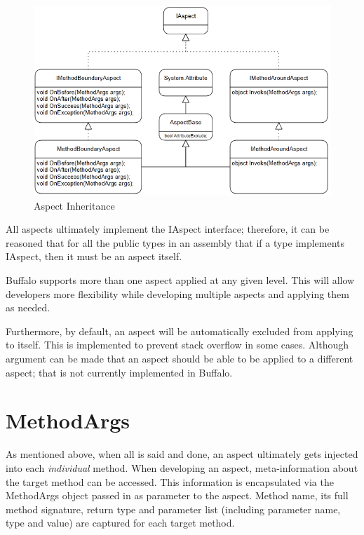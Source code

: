 \begin{figure}[H]
  \includegraphics[scale=1.0]{Uml02.PNG}
  \centering
  \caption{Aspect Inheritance\label{uml01}}
\end{figure}

All aspects ultimately implement the IAspect interface; therefore, it can be reasoned that for all the public types in an assembly that if a type implements IAspect, then it must be an aspect itself.

Buffalo supports more than one aspect applied at any given level. This will allow developers more flexibility while developing multiple aspects and applying them as needed.

Furthermore, by default, an aspect will be automatically excluded from applying to itself. This is implemented to prevent stack overflow in some cases. Although argument can be made that an aspect should be able to be applied to a different aspect; that is not currently implemented in Buffalo.



\section{MethodArgs}

As mentioned above, when all is said and done, an aspect ultimately gets injected into each \textit{individual} method. When developing an aspect, meta-information about the target method can be accessed. This information is encapsulated via the MethodArgs object passed in as parameter to the aspect. Method name, its full method signature, return type and parameter list (including parameter name, type and value) are captured for each target method.

